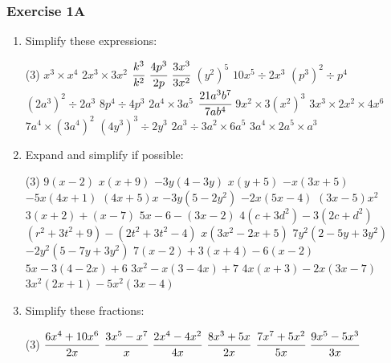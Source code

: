 \documentclass[fleqn]{article}
\newcommand{\exercise}{\subsubsection}
\begin{document}
\exercise{Exercise 1A}
\begin{enumerate}
	\item Simplify these expressions:
		\vspace{-3mm}
		\begin{tasks}(3) %
	    	\task $x^3 \times x^4$					%
	    	\task $2x^3 \times 3x^2$					%
	    	\task $\cfrac{k^3}{k^2}$					%
	    	\task $\cfrac{4p^3}{2p}$					%
	    	\task $\cfrac{3x^3}{3x^2}$				%
	    	\task $(y^2)^5$							%
	    	\task $10x^5 \div 2x^3$					%
	    	\task $(p^3)^2 \div p^4$					%
	    	\task $(2a^3)^2 \div 2a^3$				%
	    	\task $8p^4 \div 4p^3$					%
	    	\task $2a^4 \times 3a^5$					%
	    	\task $\cfrac{21a^3b^7}{7ab^4}$			%
	    	\task $9x^2 \times 3(x^2)^3$				%
	    	\task $3x^3 \times 2x^2 \times 4x^6$		%
	    	\task $7a^4 \times (3a^4)^2$				%
	    	\task $(4y^3)^3 \div 2y^3$				%
	    	\task $2a^3 \div 3a^2 \times 6a^5$		%
	    	\task $3a^4 \times 2a^5 \times a^3$		%
		\end{tasks}

	\vspace{4mm}
	\item Expand and simplify if possible:
		\begin{tasks}(3) %
			\task $9(x-2)$							%
			\task $x(x+9)$							%
			\task $-3y(4-3y)$						%
			\task $x(y+5)$							%
			\task $-x(3x+5)$							%
			\task $-5x(4x+1)$						%
			\task $(4x+5)x$							%
			\task $-3y(5-2y^2)$						%
			\task $-2x(5x-4)$						%
			\task $(3x-5)x^2$						%
			\task $3(x+2) + (x-7)$					%
			\task $5x-6-(3x-2)$						%
			\task $4(c+3d^2)-3(2c+d^2)$				%
			\task $(r^2+3t^2+9)-(2t^2+3t^2-4)$		%
			\task $x(3x^2-2x+5)$						%
			\task $7y^2(2-5y+3y^2)$					%
			\task $-2y^2(5-7y+3y^2)$					%
			\task $7(x-2)+3(x+4)-6(x-2)$				%
			\task $5x-3(4-2x)+6$						%
			\task $3x^2-x(3-4x)+7$					%
			\task $4x(x+3)-2x(3x-7)$					%
			\task $3x^2(2x+1)-5x^2(3x-4)$			%
		\end{tasks}
	
	\vspace{4mm}
	\item Simplify these fractions:
		\begin{tasks}(3) %
			\task $\cfrac{6x^4+10x^6}{2x}$			%
			\task $\cfrac{3x^5-x^7}{x}$				%
			\task $\cfrac{2x^4-4x^2}{4x}$			%
			\task $\cfrac{8x^3+5x}{2x}$				%
			\task $\cfrac{7x^7+5x^2}{5x}$			%
			\task $\cfrac{9x^5-5x^3}{3x}$			%
		\end{tasks}
\end{enumerate}
\end{document}
